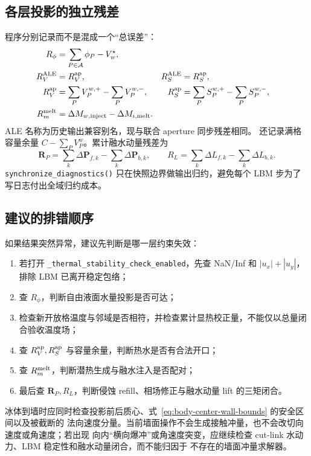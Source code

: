\documentclass[UTF8,zihao=-4]{ctexart}
\newcommand{\vect}[1]{\boldsymbol{#1}}
\newcommand{\code}[1]{\texttt{#1}}
\numberwithin{equation}{section}
\begin{document}
\subsection{各层投影的独立残差}

程序分别记录而不是混成一个“总误差”：
\begin{align}
  R_\phi&=\sum_{P\in\mathcal A}\phi_P-V_w^\star,\\
  R_V^{\rm ALE}&=R_V^{\rm ap},
  &R_S^{\rm ALE}&=R_S^{\rm ap},\\
  R_V^{\rm ap}&=\sum_PV_P^{w,+}-\sum_PV_P^{w,-},
  &R_S^{\rm ap}&=\sum_PS_P^{w,+}-\sum_PS_P^{w,-},\\
  R_m^{\rm melt}&=\Delta M_{w,\rm inject}-\Delta M_{i,\rm melt}.
  \label{eq:projection-residuals}
\end{align}
ALE 名称为历史输出兼容别名，现与联合 aperture 同步残差相同。
还记录满格容量余量 $C-\sum_PV_P^w$。累计融水动量残差为
\begin{equation}
  \vect R_P=\sum_k\Delta\vect P_{f,k}-\sum_k\Delta\vect P_{b,k},
  \qquad
  R_L=\sum_k\Delta L_{f,k}-\sum_k\Delta L_{b,k}.
  \label{eq:melt-momentum-residuals}
\end{equation}
\code{synchronize\_diagnostics()} 只在快照边界做输出归约，避免每个 LBM 步为了写日志付出全域归约成本。

\subsection{建议的排错顺序}

如果结果突然异常，建议先判断是哪一层约束失效：
\begin{enumerate}
  \item 若打开 \code{\small\_thermal\_stability\_check\_enabled}，先查 NaN/Inf 和
  $|u_x|+|u_y|$，排除 LBM 已离开稳定包络；
  \item 查 $R_\phi$，判断自由液面水量投影是否可达；
  \item 检查新开放格温度与邻域是否相符，并检查累计显热校正量，不能仅以总量闭合验收温度场；
  \item 查 $R_V^{\rm ap},R_S^{\rm ap}$ 与容量余量，判断热水是否有合法开口；
  \item 查 $R_m^{\rm melt}$，判断潜热生成与融水注入是否配对；
  \item 最后查 $\vect R_P,R_L$，判断侵蚀 refill、相场修正与融水动量 lift 的三矩闭合。
\end{enumerate}
冰体到墙时应同时检查投影前后质心、式~\eqref{eq:body-center-wall-bounds} 的安全区间以及被截断的
法向速度分量。当前墙面操作不会生成接触冲量，也不会改切向速度或角速度；若出现
向内“横向爆冲”或角速度突变，应继续检查 cut-link 水动力、LBM 稳定性和融水动量闭合，而不能归因于
不存在的墙面冲量求解器。
\end{document}
